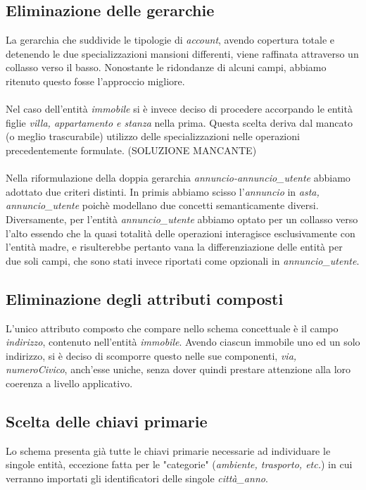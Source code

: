 \documentclass[a4paper,12pt]{report}
\begin{document}
            \subsection*{Eliminazione delle gerarchie}
                La gerarchia che suddivide le tipologie di \textit{account}, avendo copertura totale e
                detenendo le due specializzazioni mansioni differenti, viene raffinata
                attraverso un collasso verso il basso. Nonostante le ridondanze di alcuni campi,
                abbiamo ritenuto questo fosse l'approccio migliore.\\
                \\
                Nel caso dell'entità \textit{immobile} si è invece deciso di procedere accorpando le
                entità figlie \textit{villa, appartamento e stanza} nella prima. Questa scelta deriva
                dal mancato (o meglio trascurabile) utilizzo delle specializzazioni nelle operazioni
                precedentemente formulate. (SOLUZIONE MANCANTE)\\
                \\
                Nella riformulazione della doppia gerarchia \textit{annuncio-annuncio\_utente} abbiamo
                adottato due criteri distinti. In primis abbiamo scisso l'\textit{annuncio} in 
                \textit{asta, annuncio\_utente} poichè modellano due concetti semanticamente diversi.
                Diversamente, per l'entità \textit{annuncio\_utente} abbiamo optato per un collasso verso
                l'alto essendo che la quasi totalità delle operazioni interagisce esclusivamente con l'entità 
                madre, e risulterebbe pertanto vana la differenziazione delle entità per due soli campi, che 
                sono stati invece riportati come opzionali in \textit{annuncio\_utente}.


            \subsection*{Eliminazione degli attributi composti}
            L'unico attributo composto che compare nello schema concettuale è il campo \textit{indirizzo},
            contenuto nell'entità \textit{immobile}. Avendo ciascun immobile uno ed un solo indirizzo,
            si è deciso di scomporre questo nelle sue componenti, \textit{via, numeroCivico}, anch'esse uniche, senza dover quindi 
            prestare attenzione alla loro coerenza a livello applicativo.

            \subsection*{Scelta delle chiavi primarie}
            Lo schema presenta già tutte le chiavi primarie necessarie ad individuare le singole entità, eccezione fatta
            per le "categorie" (\textit{ambiente, trasporto, etc.}) in cui verranno importati gli identificatori delle 
            singole \textit{città\_anno}.
\end{document}
